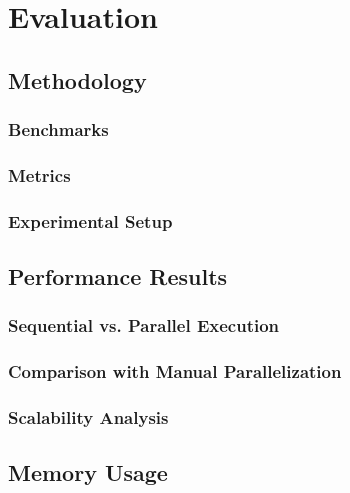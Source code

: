 \chapter{Evaluation}

\section{Methodology}

\subsection{Benchmarks}

\subsection{Metrics}

\subsection{Experimental Setup}

\section{Performance Results}

\subsection{Sequential vs. Parallel Execution}

\subsection{Comparison with Manual Parallelization}

\subsection{Scalability Analysis}

\section{Memory Usage}

